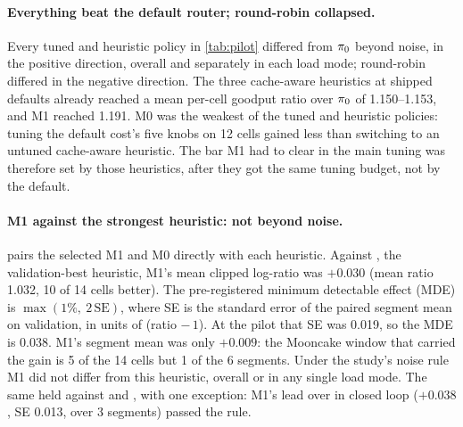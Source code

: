 \paragraph{Everything beat the default router; round-robin collapsed.}
Every tuned and heuristic policy in \cref{tab:pilot} differed from $\pi_{0}$ beyond noise, in the
positive direction, overall and separately in each load mode; round-robin differed in the negative
direction. The three cache-aware heuristics at shipped defaults already reached a mean per-cell
goodput ratio over $\pi_{0}$ of 1.150--1.153, and M1 reached 1.191. M0 was the weakest of the tuned
and heuristic policies: tuning the default cost's five knobs on 12 cells gained less than
switching to an untuned cache-aware heuristic. The bar M1 had to clear in the main tuning was
therefore set by those heuristics, after they got the same tuning budget, not by the default.

\paragraph{M1 against the strongest heuristic: not beyond noise.}
 pairs the selected M1 and M0 directly with each heuristic. Against
, the validation-best heuristic, M1's mean clipped log-ratio was
$+0.030$ (mean ratio 1.032, 10 of 14 cells better). The pre-registered minimum detectable effect
(MDE) is $\max(1\%,\ 2\,\mathrm{SE})$, where SE is the standard error of the paired segment mean
on validation, in units of (ratio $-\,1$). At the pilot that SE was 0.019, so the MDE is 0.038.
M1's segment mean was only $+0.009$: the Mooncake window that carried the gain is 5 of the 14
cells but 1 of the 6 segments. Under the study's noise rule M1 did not differ from this
heuristic, overall or in any single load mode. The same held against  and
, with one exception: M1's lead over  in closed loop ($+0.038$, SE
0.013, over 3 segments) passed the rule.

